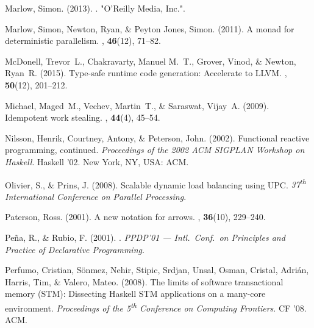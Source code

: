 \documentclass{jfp1}
\DeclareRobustCommand{\xth}{\textsuperscript{th}\xspace}
\DeclareRobustCommand{\xth}{\textsuperscript{th}\xspace}
\begin{document}
\begin{thebibliography}{}
Marlow, Simon. (2013).
.
\newblock "O'Reilly Media, Inc.".

Marlow, Simon, Newton, Ryan, \& {Peyton Jones}, Simon. (2011).
\newblock A monad for deterministic parallelism.
, {\bf 46}(12), 71--82.

McDonell, Trevor~L., Chakravarty, Manuel M.~T., Grover, Vinod, \& Newton,
  Ryan~R. (2015).
\newblock Type-safe runtime code generation: Accelerate to {LLVM}.
, {\bf 50}(12), 201--212.

Michael, Maged~M., Vechev, Martin~T., \& Saraswat, Vijay~A. (2009).
\newblock Idempotent work stealing.
, {\bf 44}(4), 45--54.

Nilsson, Henrik, Courtney, Antony, \& Peterson, John. (2002).
\newblock Functional reactive programming, continued.
 {\em Proceedings of the 2002 {ACM} {SIGPLAN}
  Workshop on {Haskell}}.
\newblock Haskell '02.
\newblock New York, NY, USA: ACM.

Olivier, S., \& Prins, J. (2008).
\newblock Scalable dynamic load balancing using {UPC}.
 {\em 37\xth International Conference on
  Parallel Processing}.

Paterson, Ross. (2001).
\newblock A new notation for arrows.
, {\bf 36}(10), 229--240.

Pe{\~n}a, R., \& Rubio, F. (2001).
.
 {\em PPDP'01 --- Intl.\ Conf.\ on
  Principles and Practice of Declarative Programming}.

Perfumo, Cristian, S\"{o}nmez, Nehir, Stipic, Srdjan, Unsal, Osman, Cristal,
  Adri\'{a}n, Harris, Tim, \& Valero, Mateo. (2008).
\newblock The limits of software transactional memory ({STM}): Dissecting
  {Haskell} {STM} applications on a many-core environment.
 {\em Proceedings of the 5\xth Conference on
  Computing Frontiers}.
\newblock CF '08.
\newblock ACM.


\end{thebibliography}
\end{document}
